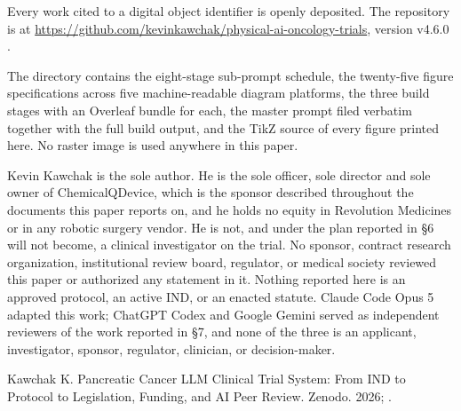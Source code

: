 
{\sloppy Every work cited to a digital object identifier is openly deposited.
The repository is at
\url{https://github.com/kevinkawchak/physical-ai-oncology-trials},
version v4.6.0 \cite{repo2026}.\par} The directory
 contains the eight-stage sub-prompt schedule, the
twenty-five figure specifications across five machine-readable diagram
platforms, the three build stages with an Overleaf bundle for each, the master
prompt filed verbatim together with the full build output, and the TikZ source
of every figure printed here. No raster image is used anywhere in this paper.



Kevin Kawchak is the sole author. He is the sole officer, sole director and sole
owner of ChemicalQDevice, which is the sponsor described throughout the
documents this paper reports on, and he holds no equity in Revolution Medicines
or in any robotic surgery vendor. He is not, and under the plan reported in
\S6 will not become, a clinical investigator on the trial. No sponsor, contract
research organization, institutional review board, regulator, or medical society
reviewed this paper or authorized any statement in it. Nothing reported here is
an approved protocol, an active IND, or an enacted statute. Claude Code Opus 5
adapted this work; ChatGPT Codex and Google Gemini served as independent
reviewers of the work reported in \S7, and none of the three is an applicant,
investigator, sponsor, regulator, clinician, or decision-maker.


Kawchak K. Pancreatic Cancer LLM Clinical Trial System: From IND to Protocol to
Legislation, Funding, and AI Peer Review. Zenodo. 2026;
.

\vspace{0.2em}
\apprule{0.5pt}
\vspace{-0.1em}

\vspace{-0.35em}
\begin{apprefs}


\end{apprefs}
